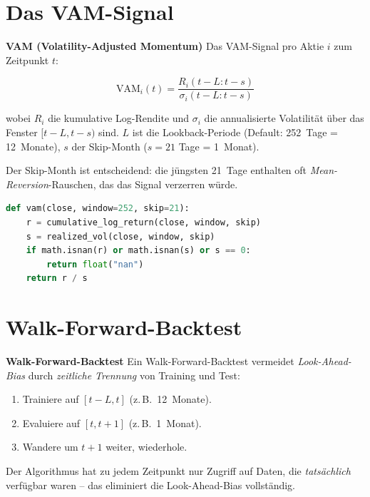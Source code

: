 \section{Das VAM-Signal}

\begin{definition}
\textbf{VAM (Volatility-Adjusted Momentum)}
Das VAM-Signal pro Aktie $i$ zum Zeitpunkt $t$:

\[
  \text{VAM}_i(t) = \frac{R_i(t-L:t-s)}{\sigma_i(t-L:t-s)}
\]

wobei $R_i$ die kumulative Log-Rendite und $\sigma_i$ die annualisierte
Volatilität über das Fenster $[t-L, t-s)$ sind. $L$ ist die
Lookback-Periode (Default: 252~Tage = 12~Monate), $s$ der
Skip-Month ($s=21$ Tage = 1~Monat).
\end{definition}

Der Skip-Month ist entscheidend: die jüngsten 21~Tage enthalten
oft \emph{Mean-Reversion}-Rauschen, das das Signal verzerren würde.

\begin{lstlisting}[language=python, caption={VAM-Implementierung},label=lst:vam]
def vam(close, window=252, skip=21):
    r = cumulative_log_return(close, window, skip)
    s = realized_vol(close, window, skip)
    if math.isnan(r) or math.isnan(s) or s == 0:
        return float("nan")
    return r / s
\end{lstlisting}

\section{Walk-Forward-Backtest}

\begin{definition}
\textbf{Walk-Forward-Backtest}
Ein Walk-Forward-Backtest vermeidet \emph{Look-Ahead-Bias} durch
\emph{zeitliche Trennung} von Training und Test:

\begin{enumerate}
  \item Trainiere auf $[t-L, t]$ (z.\,B.\ 12~Monate).
  \item Evaluiere auf $[t, t+1]$ (z.\,B.\ 1~Monat).
  \item Wandere um $t+1$ weiter, wiederhole.
\end{enumerate}

Der Algorithmus hat zu jedem Zeitpunkt nur Zugriff auf Daten, die
\emph{tatsächlich} verfügbar waren -- das eliminiert die
Look-Ahead-Bias vollständig.
\end{definition}

